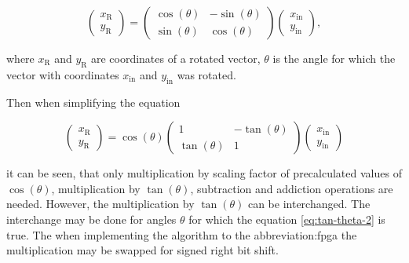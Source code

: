 \documentclass[a4paper, twoside, 11pt]{article}
\begin{document}
        \begin{equation}\label{eq:rotation}
             \begin{pmatrix}
                 x_\text{R}\\
                 y_\text{R}
             \end{pmatrix}
             =
             \begin{pmatrix}
                 \cos (\theta) & -\sin (\theta)\\
                 \sin (\theta) & \cos (\theta)
             \end{pmatrix}
             \begin{pmatrix}
                 x_\text{in}\\
                 y_\text{in}
             \end{pmatrix},
        \end{equation}

        where $x_\text{R}$ and $y_\text{R}$ are coordinates of a rotated vector, $\theta$ is the angle for which the vector with coordinates $x_\text{in}$ and $y_\text{in}$ was rotated.\par
        Then when simplifying the equation


        \begin{equation}\label{eq:rotation-simplifying}
             \begin{pmatrix}
                 x_\text{R}\\
                 y_\text{R}
             \end{pmatrix}
             = \cos (\theta)
             \begin{pmatrix}
                 1 & -\tan (\theta)\\
                 \tan (\theta) & 1
             \end{pmatrix}
             \begin{pmatrix}
                 x_\text{in}\\
                 y_\text{in}
             \end{pmatrix}
        \end{equation}

        \noindent it can be seen, that only multiplication by scaling factor of precalculated values of $\cos (\theta)$, multiplication by $\tan (\theta)$, subtraction and addiction operations are needed. However, the multiplication by $\tan (\theta)$ can be interchanged. The interchange may be done for angles $\theta$ for which the equation \ref{eq:tan-theta-2} is true. The when implementing the algorithm to the \gls{abbreviation:fpga} the multiplication may be swapped for signed right bit shift.
\end{document}
